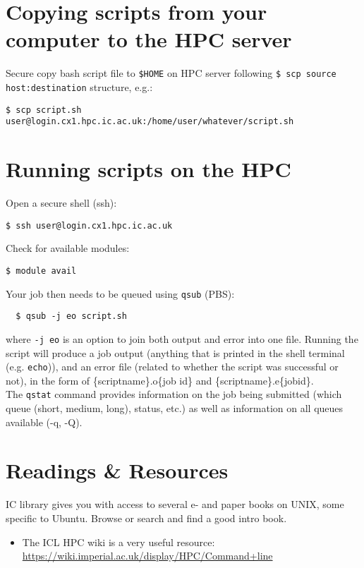 \section{Copying scripts from your computer to the HPC server}
 
Secure copy bash script file to {\tt \$HOME} on HPC server following
{\tt \$ scp source host:destination} structure, e.g.:

\begin{lstlisting}
$ scp script.sh user@login.cx1.hpc.ic.ac.uk:/home/user/whatever/script.sh
\end{lstlisting}

\section{Running scripts on the HPC}

Open a secure shell (ssh):

\begin{lstlisting}
$ ssh user@login.cx1.hpc.ic.ac.uk
\end{lstlisting}

Check for available modules:

\begin{lstlisting}
$ module avail
\end{lstlisting}

Your job then needs to be queued using {\tt qsub} (PBS):

\begin{lstlisting}
  $ qsub -j eo script.sh
\end{lstlisting}

where {\tt -j eo} is an option to join both output and error into one 
file. Running the script will produce a job output (anything that is 
printed in the shell terminal (e.g. {\tt echo})), and an error file 
(related to whether the script was successful or not), in the form of 
\{scriptname\}.o\{job id\} and \{scriptname\}.e\{jobid\}.\\

The {\tt qstat} command provides information on the job being submitted 
(which queue (short, medium, long), status, etc.) as well as 
information on all queues available (-q, -Q).

\section{Readings \& Resources}
IC library gives you with access to several e- and paper books on UNIX, some 
specific to Ubuntu. Browse or search and find a good intro book.

\begin{itemize}
  \itemsep6pt
  \item The ICL HPC wiki is a very useful resource: \url{https://wiki.imperial.ac.uk/display/HPC/Command+line}
\end{itemize}


